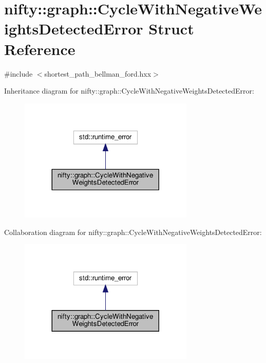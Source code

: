 \hypertarget{structnifty_1_1graph_1_1CycleWithNegativeWeightsDetectedError}{}\section{nifty\+:\+:graph\+:\+:Cycle\+With\+Negative\+Weights\+Detected\+Error Struct Reference}
\label{structnifty_1_1graph_1_1CycleWithNegativeWeightsDetectedError}


{\ttfamily \#include $<$shortest\+\_\+path\+\_\+bellman\+\_\+ford.\+hxx$>$}



Inheritance diagram for nifty\+:\+:graph\+:\+:Cycle\+With\+Negative\+Weights\+Detected\+Error\+:
\nopagebreak
\begin{figure}[H]
\begin{center}
\leavevmode
\includegraphics[width=236pt]{structnifty_1_1graph_1_1CycleWithNegativeWeightsDetectedError__inherit__graph}
\end{center}
\end{figure}


Collaboration diagram for nifty\+:\+:graph\+:\+:Cycle\+With\+Negative\+Weights\+Detected\+Error\+:
\nopagebreak
\begin{figure}[H]
\begin{center}
\leavevmode
\includegraphics[width=236pt]{structnifty_1_1graph_1_1CycleWithNegativeWeightsDetectedError__coll__graph}
\end{center}
\end{figure}

